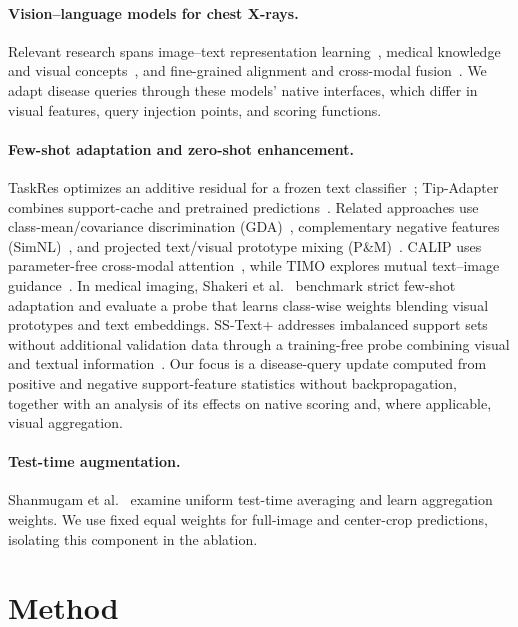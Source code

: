 \documentclass[10pt,twocolumn,letterpaper]{article}
\begin{document}
\paragraph{Vision--language models for chest X-rays.}
Relevant research spans image--text representation learning~\cite{biomedclip,chexzero,biovilt}, medical knowledge and visual concepts~\cite{medklip,kad,mavl}, and fine-grained alignment and cross-modal fusion~\cite{maco,carzero,radzero,alpharad}. We adapt disease queries through these models' native interfaces, which differ in visual features, query injection points, and scoring functions.

\paragraph{Few-shot adaptation and zero-shot enhancement.}
TaskRes optimizes an additive residual for a frozen text classifier~\cite{taskres}; Tip-Adapter combines support-cache and pretrained predictions~\cite{tipadapter}. Related approaches use class-mean/covariance discrimination (GDA)~\cite{gda}, complementary negative features (SimNL)~\cite{simnl}, and projected text/visual prototype mixing (P\&M)~\cite{projectmix}. CALIP uses parameter-free cross-modal attention~\cite{calip}, while TIMO explores mutual text--image guidance~\cite{timo}. In medical imaging, Shakeri et al.~\cite{medicalfewshot} benchmark strict few-shot adaptation and evaluate a probe that learns class-wise weights blending visual prototypes and text embeddings. SS-Text+ addresses imbalanced support sets without additional validation data through a training-free probe combining visual and textual information~\cite{sstextplus}. Our focus is a disease-query update computed from positive and negative support-feature statistics without backpropagation, together with an analysis of its effects on native scoring and, where applicable, visual aggregation.

\paragraph{Test-time augmentation.}
Shanmugam et al.~\cite{tta} examine uniform test-time averaging and learn aggregation weights. We use fixed equal weights for full-image and center-crop predictions, isolating this component in the ablation.

\section{Method}
\label{sec:method}
\end{document}
